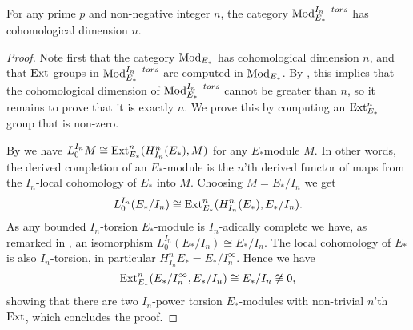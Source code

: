 \begin{lemma}
    \label{ch1:lm:cohomological-dimension-torsion-modules}
    For any prime $p$ and non-negative integer $n$, the category $\mathrm{Mod}_{E_*}^{I_n-tors}$ has cohomological dimension $n$. 
\end{lemma}
\begin{proof}
    Note first that the category $\mathrm{Mod}_{E_*}$ has cohomological dimension $n$, and that $\operatorname{Ext}$-groups in $\mathrm{Mod}_{E_*}^{I_n-tors}$ are computed in $\mathrm{Mod}_{E_*}$. By \cite[2.1.4]{brodmann-sharp_1998}, this implies that the cohomological dimension of $\mathrm{Mod}_{E_*}^{I_n-tors}$ cannot be greater than $n$, so it remains to prove that it is exactly $n$. We prove this by computing an $\operatorname{Ext}^n_{E_*}$ group that is non-zero.
    
    By \cite[A.2(d)]{hovey-strickland_99} we have $L^{I_n}_0 M \cong \operatorname{Ext}_{E_*}^n(H_{I_n}^n(E_*), M)$ for any $E_*$module $M$. In other words, the derived completion of an $E_*$-module is the $n$'th derived functor of maps from the $I_n$-local cohomology of $E_*$ into $M$. Choosing $M=E_*/I_n$ we get 
    $$L^{I_n}_0 (E_*/I_n)\cong \operatorname{Ext}_{E_*}^n(H^n_{I_n}(E_*), E_*/I_n).$$
    As any bounded $I_n$-torsion $E_*$-module is $I_n$-adically complete we have, as remarked in \cite[1.4]{barthel-heard_16}, an isomorphism $L^{I_n}_0 (E_*/I_n)\cong E_*/I_n$. The local cohomology of $E_*$ is also $I_n$-torsion, in particular $H_{I_n}^n E_* = E_*/I_n^\infty$. Hence we have 
    $$\operatorname{Ext}_{E_*}^n(E_*/I_n^\infty, E_*/I_n)\cong E_*/I_n \not \cong 0,$$
    showing that there are two $I_n$-power torsion $E_*$-modules with non-trivial $n$'th $\operatorname{Ext}$, which concludes the proof.
\end{proof}

